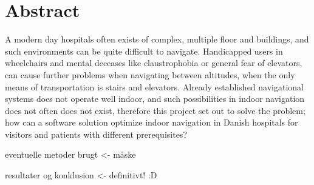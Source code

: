\section{Abstract}

    A modern day hospitals often exists of complex, multiple floor and buildings, and such environments can be quite difficult to navigate. Handicapped users in wheelchairs and mental deceases like claustrophobia or general fear of elevators, can cause further problems when navigating between altitudes, when the only means of transportation is stairs and elevators. Already established navigational systems does not operate well indoor, and such possibilities in indoor navigation does not often does not exist, therefore this project set out to solve the problem; how can a software solution optimize indoor navigation in Danish hospitals for visitors and patients with different prerequisites?

    eventuelle metoder brugt <- måske

    resultater og konklusion <- definitivt! :D